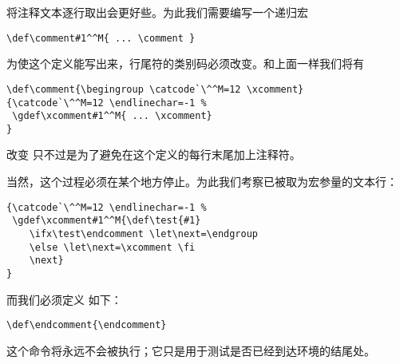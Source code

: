 \documentclass{book}
\begin{document}
将注释文本逐行取出会更好些。为此我们需要编写一个递归宏
\begin{verbatim}
\def\comment#1^^M{ ... \comment }
\end{verbatim}
为使这个定义能写出来，行尾符的类别码必须改变。和上面一样我们将有
\begin{verbatim}
\def\comment{\begingroup \catcode`\^^M=12 \xcomment}
{\catcode`\^^M=12 \endlinechar=-1 %
 \gdef\xcomment#1^^M{ ... \xcomment}
}
\end{verbatim}
改变  只不过是为了避免在这个定义的每行末尾加上注释符。

当然，这个过程必须在某个地方停止。为此我们考察已被取为宏参量的文本行：
\begin{verbatim}
{\catcode`\^^M=12 \endlinechar=-1 %
 \gdef\xcomment#1^^M{\def\test{#1}
    \ifx\test\endcomment \let\next=\endgroup
    \else \let\next=\xcomment \fi
    \next}
}
\end{verbatim}
而我们必须定义  如下：
\begin{verbatim}
\def\endcomment{\endcomment}
\end{verbatim}
这个命令将永远不会被执行；它只是用于测试是否已经到达环境的结尾处。
\end{document}
